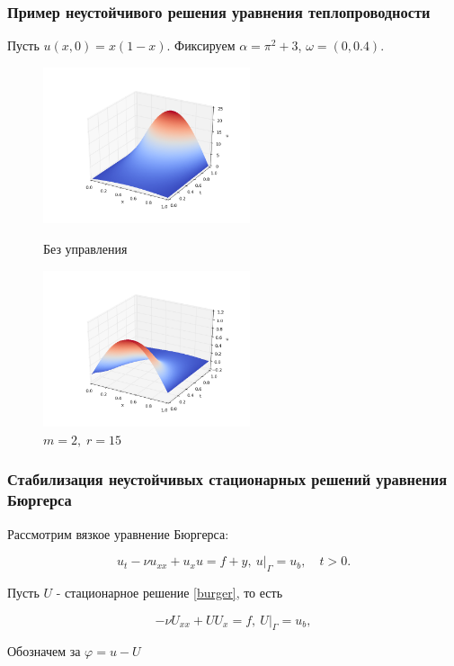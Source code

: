 \documentclass{beamer}
\begin{document}
\begin{frame}
\frametitle{Пример неустойчивого решения уравнения теплопроводности}

Пусть $u(x, 0) = x(1 - x)$. Фиксируем $\alpha = \pi^2 + 3$, $\omega = (0, 0.4)$.


\begin{figure}[H]
\centering
\begin{minipage}{.5\textwidth}
  \centering
  \includegraphics[width=2.4in]{par_ex_pi3}
  \caption{Без управления}
  \label{fig:test1}
\end{minipage}%
\begin{minipage}{.5\textwidth}
  \centering
  \includegraphics[width=2.4in]{par_re_pi3}
  \caption{$m = 2,\; r = 15$}
  \label{fig:test2}
\end{minipage}
\end{figure}

\end{frame}

\begin{frame}
\frametitle{Стабилизация неустойчивых стационарных решений уравнения Бюргерса}

Рассмотрим вязкое уравнение Бюргерса:
\begin{block}{}

\begin{equation}\label{burger}
    u_t - \nu u_{xx} + u_x u = f + y, \ u|_{\Gamma} = u_b, \quad t > 0.
\end{equation}

\end{block}

Пусть $U$ - стационарное решение \eqref{burger}, то есть

\begin{block}{}
\begin{equation}\label{stationary_sol}
    -\nu U_{xx} + U U_x = f, \ U|_{\Gamma} = u_b,
\end{equation}
\end{block}

Обозначем за $\varphi = u - U$

\end{frame}
\end{document}
